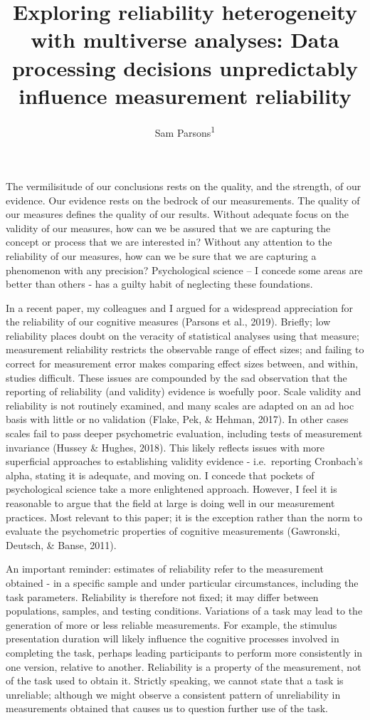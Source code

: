 \documentclass[
  english,
  man,floatsintext]{apa6}
\author{Sam Parsons\textsuperscript{1}}
\affiliation{
\vspace{0.5cm}
\textsuperscript{1} University of Oxford}
\title{Exploring reliability heterogeneity with multiverse analyses: Data processing decisions unpredictably influence measurement reliability}
\date{}
\begin{document}
\maketitle

The vermilisitude of our conclusions rests on the quality, and the strength, of our evidence. Our evidence rests on the bedrock of our measurements. The quality of our measures defines the quality of our results. Without adequate focus on the validity of our measures, how can we be assured that we are capturing the concept or process that we are interested in? Without any attention to the reliability of our measures, how can we be sure that we are capturing a phenomenon with any precision? Psychological science -- I concede some areas are better than others - has a guilty habit of neglecting these foundations.

In a recent paper, my colleagues and I argued for a widespread appreciation for the reliability of our cognitive measures (Parsons et al., 2019). Briefly; low reliability places doubt on the veracity of statistical analyses using that measure; measurement reliability restricts the observable range of effect sizes; and failing to correct for measurement error makes comparing effect sizes between, and within, studies difficult. These issues are compounded by the sad observation that the reporting of reliability (and validity) evidence is woefully poor. Scale validity and reliability is not routinely examined, and many scales are adapted on an ad hoc basis with little or no validation (Flake, Pek, \& Hehman, 2017). In other cases scales fail to pass deeper psychometric evaluation, including tests of measurement invariance (Hussey \& Hughes, 2018). This likely reflects issues with more superficial approaches to establishing validity evidence - i.e.~reporting Cronbach's alpha, stating it is adequate, and moving on. I concede that pockets of psychological science take a more enlightened approach. However, I feel it is reasonable to argue that the field at large is doing well in our measurement practices. Most relevant to this paper; it is the exception rather than the norm to evaluate the psychometric properties of cognitive measurements (Gawronski, Deutsch, \& Banse, 2011).

An important reminder: estimates of reliability refer to the measurement obtained - in a specific sample and under particular circumstances, including the task parameters. Reliability is therefore not fixed; it may differ between populations, samples, and testing conditions. Variations of a task may lead to the generation of more or less reliable measurements. For example, the stimulus presentation duration will likely influence the cognitive processes involved in completing the task, perhaps leading participants to perform more consistently in one version, relative to another. Reliability is a property of the measurement, not of the task used to obtain it. Strictly speaking, we cannot state that a task is unreliable; although we might observe a consistent pattern of unreliability in measurements obtained that causes us to question further use of the task.
\end{document}
